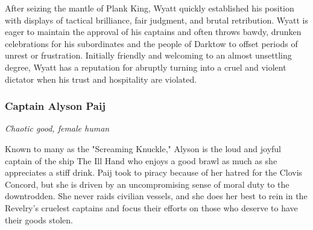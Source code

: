 \documentclass[10pt,a4paper,twoside,bg=print,twocolumn,openany,nodeprecatedcode]{dndbook}
\begin{document}
After seizing the mantle of Plank King, Wyatt quickly established his position with displays of tactical brilliance, fair judgment, and brutal retribution. Wyatt is eager to maintain the approval of his captains and often throws bawdy, drunken celebrations for his subordinates and the people of Darktow to offset periods of unrest or frustration. Initially friendly and welcoming to an almost unsettling degree, Wyatt has a reputation for abruptly turning into a cruel and violent dictator when his trust and hospitality are violated.

\subsubsection{Captain Alyson Paij}
\textit{Chaotic good, female human}

Known to many as the "Screaming Knuckle," Alyson is the loud and joyful captain of the ship The Ill Hand who enjoys a good brawl as much as she appreciates a stiff drink. Paij took to piracy because of her hatred for the Clovis Concord, but she is driven by an uncompromising sense of moral duty to the downtrodden. She never raids civilian vessels, and she does her best to rein in the Revelry's cruelest captains and focus their efforts on those who deserve to have their goods stolen.
\end{document}
